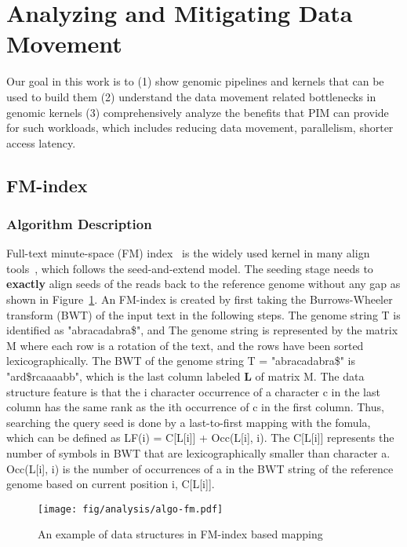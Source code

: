 \section{Analyzing and Mitigating Data Movement}
Our goal in this work is to (1) show genomic pipelines and kernels that can be used to build them (2) understand the data movement related bottlenecks in genomic kernels (3) comprehensively analyze the benefits that PIM can provide for such workloads, which includes reducing data movement, parallelism, shorter access latency.

\subsection{FM-index}
\subsubsection{Algorithm Description}
Full-text minute-space (FM) index~\cite{bwt} is the widely used kernel in many align tools~\cite{ahmed2016comparison}, which follows the seed-and-extend model. The seeding stage needs to \textbf{exactly} align seeds of the reads back to the reference genome without any gap as shown in Figure~\ref{fig:algo-fm}. An FM-index is created by first taking the Burrows-Wheeler transform (BWT) of the input text in the following steps.  The genome string T is identified as "abracadabra\$",  and The genome string is represented by the matrix M where each row is a rotation of the text, and the rows have been sorted lexicographically.  The BWT of the genome string T = "abracadabra\$" is "ard\$rcaaaabb", which is the last column labeled \textbf{L} of matrix M. The data structure feature is that the i character occurrence of a character c in the last column has the same rank as the ith occurrence of c in the first column. Thus, searching the query seed is done by a last-to-first mapping with the fomula, which can be defined as LF(i) = C[L[i]] + Occ(L[i], i). The C[L[i]] represents the number of symbols in BWT that are lexicographically smaller than character a. Occ(L[i], i) is the number of occurrences of a in the BWT string of the reference genome based on current position i, C[L[i]].

\begin{figure}[htbp]
\centering
\texttt{[image: fig/analysis/algo-fm.pdf]}
\caption{An example of data structures in FM-index based mapping}
\label{fig:algo-fm}
\end{figure}

